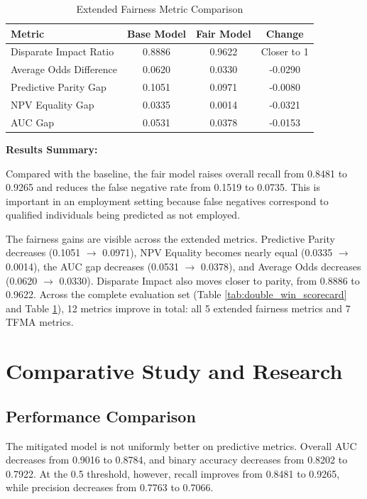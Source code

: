 \documentclass[11pt,a4paper]{article}
\begin{document}
\begin{table}[h]
\centering
\caption{Extended Fairness Metric Comparison}
\label{tab:extended_fairness_comparison}
\begin{tabular}{|l|c|c|c|}
\hline
\textbf{Metric} & \textbf{Base Model} & \textbf{Fair Model} & \textbf{Change} \\
\hline
Disparate Impact Ratio & 0.8886 & 0.9622 & Closer to 1 \\
Average Odds Difference & 0.0620 & 0.0330 & -0.0290 \\
Predictive Parity Gap & 0.1051 & 0.0971 & -0.0080 \\
NPV Equality Gap & 0.0335 & 0.0014 & -0.0321 \\
AUC Gap & 0.0531 & 0.0378 & -0.0153 \\
\hline
\end{tabular}
\end{table}


\textbf{Results Summary:}

Compared with the baseline, the fair model raises overall recall from 0.8481 to 0.9265 and reduces the false negative rate from 0.1519 to 0.0735. This is important in an employment setting because false negatives correspond to qualified individuals being predicted as not employed.

The fairness gains are visible across the extended metrics. Predictive Parity decreases (0.1051 $\rightarrow$ 0.0971), NPV Equality becomes nearly equal (0.0335 $\rightarrow$ 0.0014), the AUC gap decreases (0.0531 $\rightarrow$ 0.0378), and Average Odds decreases (0.0620 $\rightarrow$ 0.0330). Disparate Impact also moves closer to parity, from 0.8886 to 0.9622. Across the complete evaluation set (Table \ref{tab:double_win_scorecard} and Table \ref{tab:extended_fairness_comparison}), 12 metrics improve in total: all 5 extended fairness metrics and 7 TFMA metrics.

\section{Comparative Study and Research}
\label{sec:comparison}

\subsection{Performance Comparison}

The mitigated model is not uniformly better on predictive metrics. Overall AUC decreases from 0.9016 to 0.8784, and binary accuracy decreases from 0.8202 to 0.7922. At the 0.5 threshold, however, recall improves from 0.8481 to 0.9265, while precision decreases from 0.7763 to 0.7066.
\end{document}
